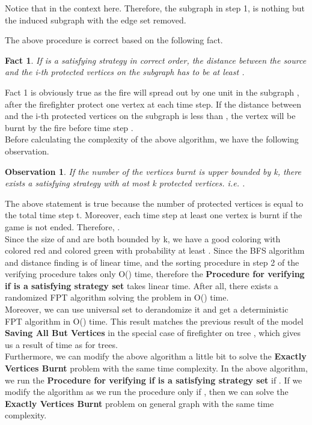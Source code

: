 \documentclass[11pt,letter]{article}
\newtheorem{Obs}{Observation}
\newtheorem{Fact}{Fact}
\begin{document}
Notice that  in the context here. Therefore, the subgraph  in step 1, is nothing but the induced subgraph  with the edge set  removed.

The above procedure is correct based on the following fact.

\begin{Fact} If  is a satisfying strategy in correct order, the distance between the source  and the i-th protected vertices  on the subgraph  has to be at least .
\end{Fact}

Fact 1 is obviously true as the fire will spread out by one unit in the subgraph , after the firefighter protect one vertex at each time step. If the distance between  and the i-th protected vertices  on the subgraph  is less than , the vertex  will be burnt by the fire before time step .\\

Before calculating the complexity of the above algorithm, we have the following observation.

\begin{Obs}
If the number of the vertices burnt is upper bounded by k, there exists a satisfying strategy  with at most k protected vertices. i.e. .
\end{Obs}

The above statement is true because the number of protected vertices is equal to the total time step t. Moreover, each time step at least one vertex is burnt if the game is not ended. Therefore, . \\

Since the size of  and  are both bounded by k, we have a good coloring with  colored red and  colored green with probability at least . Since the BFS algorithm and distance finding is of linear time, and the sorting procedure in step 2 of the verifying procedure takes only O() time, therefore the \textbf{Procedure for verifying if  is a satisfying strategy set} takes linear time. After all, there exists a randomized FPT algorithm solving the problem in O() time.\\ 

Moreover, we can use  universal set to derandomize it and get a deterministic FPT algorithm in O() time. This result matches the previous result of the model \textbf{Saving All But  Vertices} in the special case of firefighter on tree \cite{CVY08}, which gives us a result of  time as  for trees. \\

Furthermore, we can modify the above algorithm a little bit to solve the \textbf{Exactly  Vertices Burnt} problem with the same time complexity. In the above algorithm, we run the \textbf{Procedure for verifying if  is a satisfying strategy set} if . If we modify the algorithm as we run the procedure only if , then we can solve the \textbf{Exactly  Vertices Burnt} problem on general graph with the same time complexity.
\end{document}
